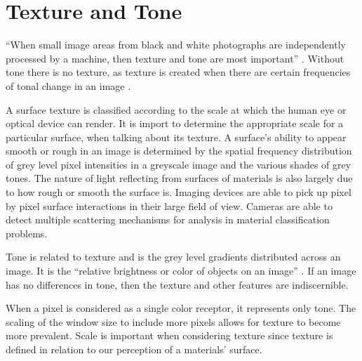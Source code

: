 \section{Texture and Tone}

“When small image areas from black and white photographs are independently processed by a machine, then texture and tone are most important” \cite{haralick}.  Without tone there is no texture, as texture is created when there are certain frequencies of tonal change in an image \cite{remotesensing}.

A surface texture is classified according to the scale at which the human eye or optical device can render.  It is import to determine the appropriate scale for a particular surface, when talking about its texture.  A surface's ability to appear smooth or rough in an image is determined by the spatial frequency distribution of grey level pixel intensities in a greyscale image and the various shades of grey tones.  The nature of light reflecting from surfaces of materials is also largely due to how rough or smooth the surface is.  Imaging devices are able to pick up pixel by pixel surface interactions in their large field of view.  Cameras are able to detect multiple scattering mechanisms for analysis in material classification problems.

Tone is related to texture and is the grey level gradients distributed across an image.  It is the “relative brightness or color of objects on an image” \cite{remotesensing}.  If an image has no differences in tone, then the texture and other features are indiscernible.

When a pixel is considered as a single color receptor, it represents only tone.  The scaling of the window size to include more pixels allows for texture to become more prevalent.   Scale is important when considering texture since texture is defined in relation to our perception of a materials' surface.



